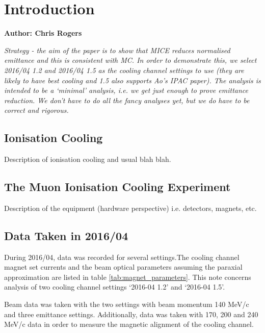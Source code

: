 \section{Introduction}
\label{Sect:Intro}

\textbf{Author: Chris Rogers}

\emph{Strategy - the aim of the paper is to show that MICE reduces normalised 
emittance and this is consistent with MC. In order to demonstrate this, we 
select 2016/04 1.2 and 2016/04 1.5 as the cooling channel settings to use (they 
are likely to have best cooling and 1.5 also supports Ao's IPAC paper). The
analysis is intended to be a `minimal' analysis, i.e. we get just enough to
prove emittance reduction. We don't have to do all the fancy analyses yet, but 
we do have to be correct and rigorous.}

\subsection{Ionisation Cooling}
Description of ionisation cooling and usual blah blah.

\subsection{The Muon Ionisation Cooling Experiment}
Description of the equipment (hardware perspective) i.e. detectors, magnets, etc.

\subsection{Data Taken in 2016/04}
During 2016/04, data was recorded for several settings.The cooling channel 
magnet set currents and the beam optical parameters assuming the paraxial 
approximation are listed in table \ref{tab:magnet_parameters}. This note 
concerns analysis of two cooling channel settings `2016-04 1.2' and
`2016-04 1.5'.

Beam data was taken with the two settings with beam momentum 140 MeV/c and three
emittance settings. Additionally, data was taken with 170, 200 and 240 MeV/c
data in order to measure the magnetic alignment of the cooling channel.

